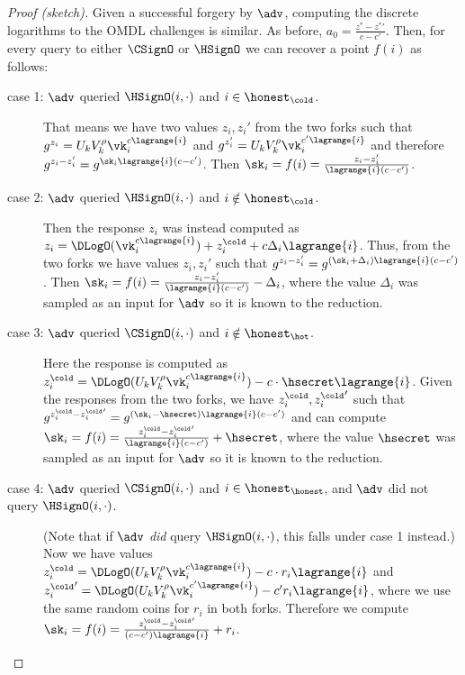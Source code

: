 \begin{proof}[Proof (sketch)]
Given a successful forgery by $\adv$, computing the discrete logarithms to the OMDL challenges is similar. As before, $a_0 = \frac{z^* - {z^*}'}{c-c'}$. Then, for every query to either $\CSignO$ or $\HSignO$ we can recover a point $f(i)$ as follows:
\begin{description}
    \item[case 1: $\adv$ queried $\HSignO(i, \cdot)$ and $i \in \honest_\cold$.] That means we have two values $z_i, z_i'$ from the two forks such that $g^{z_i} = U_k V_k^\rho \vk_i^{c \lagrange{i}}$ and $g^{z_i'} = U_k V_k^\rho \vk_i^{c' \lagrange{i}}$ and therefore $g^{z_i - z_i'} = g^{\sk_i \lagrange{i} (c-c')}$. Then $\sk_i = f(i) = \frac{z_i - z_i'}{\lagrange{i}(c-c')}$.
    \item[case 2: $\adv$ queried $\HSignO(i, \cdot)$ and $i \notin \honest_\cold$.] Then the response $z_i$ was instead computed as $z_i = \DLogO(\vk_i^{c \lagrange{i}}) + z_i^\cold + c \Delta_i \lagrange{i}$. Thus,  from the two forks we have values $z_i, z_i'$ such that $g^{z_i-z_i'} = g^{(\sk_i + \Delta_i) \lagrange{i} (c-c')}$. Then $\sk_i = f(i) = \frac{z_i - z_i'}{\lagrange{i}(c-c')} - \Delta_i$, where the value $\Delta_i$ was sampled as an input for $\adv$ so it is known to the reduction.
    \item[case 3: $\adv$ queried $\CSignO(i, \cdot)$ and $i \notin \honest_\hot$.] Here the response is computed as $z_i^\cold = \DLogO(U_k V_k^\rho \vk_i^{c \lagrange{i}}) - c \cdot \hsecret \lagrange{i}$. Given the responses from the two forks, we have $z_i^\cold, {z_i^\cold}'$ such that $g^{z_i^\cold - {z_i^\cold}'} = g^{(\sk_i - \hsecret) \lagrange{i} (c-c')}$ and can compute $\sk_i = f(i) = \frac{z_i^\cold - {z_i^\cold}'}{\lagrange{i} (c-c')} + \hsecret$, where the value $\hsecret$ was sampled as an input for $\adv$ so it is known to the reduction.
    \item[case 4: $\adv$ queried $\CSignO(i, \cdot)$ and $i \in \honest_\honest$, and $\adv$ did not query $\HSignO(i, \cdot)$.] (Note that if $\adv$ \emph{did} query $\HSignO(i, \cdot)$, this falls under case 1 instead.) Now we have values $z_i^\cold = \DLogO(U_k V_k^\rho \vk_i^{c \lagrange{i}}) - c \cdot r_i \lagrange{i}$ and ${z_i^\cold}' = \DLogO(U_k V_k^\rho \vk_i^{c' \lagrange{i}}) - c' r_i \lagrange{i}$, where we use the same random coins for $r_i$ in both forks. Therefore we compute $\sk_i = f(i) = \frac{z_i^\cold - {z_i^\cold}'}{(c-c')\lagrange{i}} + r_i$.
\end{description}


\end{proof}
